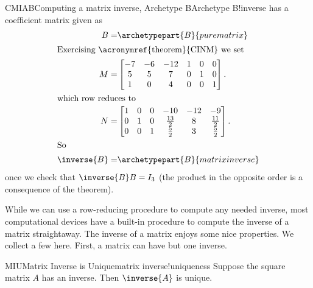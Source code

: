 %
\begin{example}{CMIAB}{Computing a matrix inverse, Archetype B}{Archetype B!inverse}
%
 has a coefficient matrix given as
%
\begin{align*}
B=&\archetypepart{B}{purematrix}\\
%
\intertext{Exercising \acronymref{theorem}{CINM} we set}
%
M=&
\begin{bmatrix}
-7&-6&-12&1&0&0\\
 5&5&7&0&1&0\\
 1&0&4&0&0&1
\end{bmatrix}.\\
%
\intertext{which row reduces to}
%
N=&
\begin{bmatrix}
1&0&0&-10 & -12 & -9\\
0&1&0&\frac{13}{2} & 8 & \frac{11}{2}\\
0&0&1&\frac{5}{2} & 3 & \frac{5}{2}
\end{bmatrix}.\\
%
\intertext{So}
%
\inverse{B}=&\archetypepart{B}{matrixinverse}
\end{align*}
%
once we check that $\inverse{B}B=I_3$ (the product in the opposite order is a consequence of the theorem).
%
\end{example}
%
{While we can use a row-reducing procedure to compute any needed inverse, most computational devices have a built-in procedure to compute the inverse of a matrix straightaway.
}
{
{}{\relax}%
{}{\relax}%
}{
%
%
}
%
%
The inverse of a matrix enjoys some nice properties.  We collect a few here.  First, a matrix can have but one inverse.
%
\begin{theorem}{MIU}{Matrix Inverse is Unique}{matrix inverse!uniqueness}
Suppose the square matrix $A$ has an inverse.  Then $\inverse{A}$ is unique.
\end{theorem}
%
